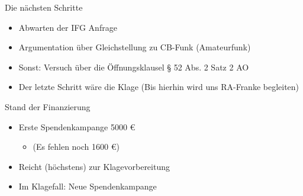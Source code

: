 \begin{frame}{Die nächsten Schritte}
    \begin{itemize}
        \item Abwarten der IFG Anfrage
        \item Argumentation über Gleichstellung zu CB-Funk (Amateurfunk)
        \item Sonst: Versuch über die Öffnungsklausel § 52 Abs. 2 Satz 2 AO
        \item Der letzte Schritt wäre die Klage (Bis hierhin wird uns RA-Franke begleiten)
    \end{itemize}
\end{frame}

\begin{frame}{Stand der Finanzierung}
    \begin{itemize}
        \item Erste Spendenkampange 5000 €
        \begin{itemize}
            \item (Es fehlen noch 1600 €)
        \end{itemize}
        \item Reicht (höchstens) zur Klagevorbereitung
        \item Im Klagefall: Neue Spendenkampange
    \end{itemize}
\end{frame}
